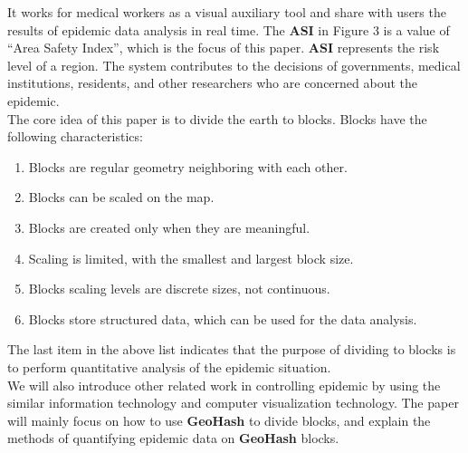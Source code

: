 \documentclass[sigplan,screen]{acmart}
\begin{document}
It works for medical workers as a visual auxiliary tool and share with users the results of epidemic data analysis in real time.
The \textbf{ASI} in Figure 3 is a value of ``Area Safety Index'', which is the focus of this paper.
\textbf{ASI} represents the risk level of a region.
The system contributes to the decisions of governments, medical institutions, residents, and other researchers who are concerned about the epidemic.
\\
The core idea of this paper is to divide the earth to blocks. Blocks have the following characteristics:
\begin{enumerate}
	\item Blocks are regular geometry neighboring with each other.
	\item Blocks can be scaled on the map.
	\item Blocks are created only when they are meaningful.
	\item Scaling is limited, with the smallest and largest block size.
	\item Blocks scaling levels are discrete sizes, not continuous.
	\item Blocks store structured data, which can be used for the data analysis.
\end{enumerate}
The last item in the above list indicates that the purpose of dividing to blocks is to perform quantitative analysis of the epidemic situation.
\\
We will also introduce other related work in controlling epidemic by using the similar information technology and computer visualization technology.
The paper will mainly focus on how to use \textbf{GeoHash} to divide blocks, and explain the methods of quantifying epidemic data on \textbf{GeoHash} blocks.
\end{document}
